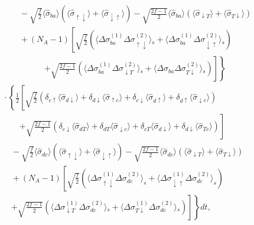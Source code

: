 \documentclass[aps,pra,twocolumn,superscriptaddress]{revtex4-1} %
\newcommand{\nn}{\nonumber}
\newcommand{\expect}[1]{\big\langle #1 \big\rangle}
\begin{document}
\begin{appendix}
\begin{align}
&\quad\quad\quad -\!\sqrt{\!\frac{f}{2}}\expect{\!\hat{\sigma}_{ba}\! }\!\left(\!\expect{\!\hat{\sigma}_{\uparrow\downarrow}\! }\!\!+\!\expect{\!\hat{\sigma}_{\downarrow\uparrow}\! }\! \right)\! \!-\!\sqrt{\!\frac{2f\!\!-\!\!1}{2}} \expect{\!\hat{\sigma}_{ba}\!}\!\left(\!\expect{\!\hat{\sigma}_{\downarrow T}\!}\!+\!\expect{\!\hat{\sigma}_{T\downarrow}\!}\! \right)\nn\\ &\quad\quad\quad+\!(N_A\!-\!1)\left[\sqrt{\frac{f}{2}}\!\left(\expect{\!\Delta \sigma^{(1)}_{ba}  \Delta\sigma_{\uparrow\downarrow}^{(2)}}\!_s \!+\!\expect{\!\Delta\sigma_{ba}^{(\!1\!)}\Delta\sigma_{\downarrow\uparrow}^{(\!2\!)}}\!_s\right)\right.\nn\\
&\quad\quad\quad\quad\quad\quad\left.\left. + \sqrt{\frac{2f\!-\! 1}{2}}\!\left(\!\expect{\!\Delta \sigma^{(\!1\!)}_{ba}\Delta \sigma_{\downarrow T}^{(\!2\!)}}\!_s \!+\! \expect{\!\Delta\sigma_{ba}\Delta\sigma_{T\downarrow}^{(2)}}\!_s \!\right)\!\right] \! \right\}\nn\\
&\quad\!\cdot\!\left\{\! \frac{1}{2}\!\left[\! \sqrt{\!\frac{f}{2}}\!\left(\!\delta_{c\uparrow}\expect{\!\hat{\sigma}_{d\downarrow}\!}\!+\! \delta_{d\downarrow}\expect{\!\hat{\sigma}_{\uparrow c}\!}\!+\!\delta_{c\downarrow}\expect{\!\hat{\sigma}_{d\uparrow}\!} \!+\!\delta_{d\uparrow}\expect{\!\hat{\sigma}_{\downarrow c}\! }\! \right)\right.\right.\nn\\
&\quad\quad\quad\left. +\sqrt{\!\frac{2f\!-\!1}{2}}\!\left(\!\delta_{c\downarrow}\expect{\!\hat{\sigma}_{dT}\!} \!\!+\! \delta_{dT}\expect{\!\hat{\sigma}_{\downarrow c}\! }\!+\!\delta_{cT}\expect{\!\hat{\sigma}_{d\downarrow}\! } \!+\!\delta_{d\downarrow}\expect{\!\hat{\sigma}_{Tc}\! }\! \right)\!\right] \nn\\
&\quad\quad -\sqrt{\!\frac{f}{2}}\expect{\!\hat{\sigma}_{dc}\! }\!\left(\!\expect{\!\hat{\sigma}_{\uparrow\downarrow} \!}\!+\!\expect{\!\hat{\sigma}_{\downarrow\uparrow}\! }\! \right) \!-\!\sqrt{\!\frac{2f-1}{2}}\! \expect{\!\hat{\sigma}_{dc}\!}\!\left(\!\expect{\!\hat{\sigma}_{\downarrow T}\!}\!+\!\expect{\!\hat{\sigma}_{T\downarrow}\!}\! \right)\nn\\
&\quad\quad + \!(N_A\!-\!1)\!\left[\! \sqrt{\!\frac{f}{2}} \left(\expect{\Delta\sigma_{\uparrow\downarrow}^{(1)}\Delta\sigma_{dc}^{(2)}}_s \!+\!\expect{\Delta\sigma_{\downarrow\uparrow}^{(1)}\Delta \sigma_{dc}^{(2)}}_s\right)\right. \nn\\
&\quad\quad\left.\left. + \sqrt{\!\frac{2f\!\!-\!\! 1}{2}}\!\!\left(\!\expect{\!\Delta \sigma\!_{\downarrow T}^{(\!1\!)}\Delta\sigma\!_{dc}^{(\!2\!)}}\!_s \!\!+\!\expect{\!\Delta\sigma\!_{T\downarrow}^{(\! 1\! )} \Delta \sigma\!_{dc}^{(\!2\!)} }\!_s\!\right)\!\right]\!  \right\}\!dt,\label{eq:dsigmabadc_QND_expand}

\end{align}
\end{appendix}
\end{document}
